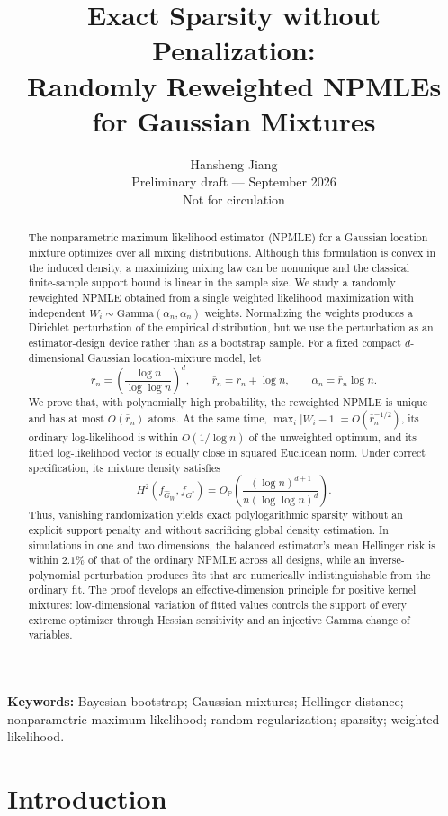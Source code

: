 \documentclass[11pt]{article}
\title{\bfseries Exact Sparsity without Penalization:\\
Randomly Reweighted NPMLEs for Gaussian Mixtures}
\author{Hansheng Jiang\\
\small Preliminary draft --- September 2026\\
\small Not for circulation}
\date{}
\theoremstyle{definition}
\theoremstyle{remark}
\newcommand{\PP}{\mathbb P}
\newcommand{\abs}[1]{\lvert #1\rvert}
\newcommand{\Ghat}{\widehat G}
\begin{document}
\maketitle

\begin{abstract}
The nonparametric maximum likelihood estimator (NPMLE) for a Gaussian
location mixture optimizes over all mixing distributions.  Although this
formulation is convex in the induced density, a maximizing mixing law can be
nonunique and the classical finite-sample support bound is linear in the
sample size.  We study a randomly reweighted NPMLE obtained from a single
weighted likelihood maximization with independent
$W_i\sim\mathrm{Gamma}(\alpha_n,\alpha_n)$ weights.  Normalizing the weights
produces a Dirichlet perturbation of the empirical distribution, but we use
the perturbation as an estimator-design device rather than as a bootstrap
sample.  For a fixed compact $d$-dimensional Gaussian location-mixture model,
let
\[
 r_n=\left(\frac{\log n}{\log\log n}\right)^d,
 \qquad \bar r_n=r_n+\log n,
 \qquad \alpha_n=\bar r_n\log n.
\]
We prove that, with polynomially high probability, the reweighted NPMLE is
unique and has at most $O(\bar r_n)$ atoms.  At the same time,
$\max_i\abs{W_i-1}=O(\bar r_n^{-1/2})$, its ordinary log-likelihood is within
$O(1/\log n)$ of the unweighted optimum, and its fitted log-likelihood vector
is equally close in squared Euclidean norm.  Under correct specification, its
mixture density satisfies
\[
 H^2(f_{\Ghat_W},f_{G^*})
 =O_{\PP}\!\left(\frac{(\log n)^{d+1}}
 {n(\log\log n)^d}\right).
\]
Thus, vanishing randomization yields exact polylogarithmic sparsity without
an explicit support penalty and without sacrificing global density
estimation.  In simulations in one and two dimensions, the balanced
estimator's mean Hellinger risk is within $2.1\%$ of that of the ordinary
NPMLE across all designs, while an inverse-polynomial perturbation produces
fits that are numerically indistinguishable from the ordinary fit.  The proof
develops an effective-dimension principle for positive kernel mixtures:
low-dimensional variation of fitted values controls the support of every
extreme optimizer through Hessian sensitivity and an injective Gamma change
of variables.
\end{abstract}

\noindent\textbf{Keywords:} Bayesian bootstrap; Gaussian mixtures; Hellinger
distance; nonparametric maximum likelihood; random regularization; sparsity;
weighted likelihood.

\section{Introduction}\label{sec:introduction}
\end{document}
